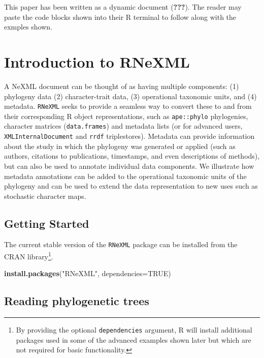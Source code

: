\documentclass[author-year, review, 11pt]{components/elsarticle} %
\newenvironment{Shaded}{\begin{snugshade}}{\end{snugshade}}
\newcommand{\KeywordTok}[1]{\textcolor[rgb]{0.13,0.29,0.53}{\textbf{{#1}}}}
\newcommand{\DataTypeTok}[1]{\textcolor[rgb]{0.13,0.29,0.53}{{#1}}}
\newcommand{\StringTok}[1]{\textcolor[rgb]{0.31,0.60,0.02}{{#1}}}
\newcommand{\OtherTok}[1]{\textcolor[rgb]{0.56,0.35,0.01}{{#1}}}
\newcommand{\NormalTok}[1]{{#1}}
\begin{document}
This paper has been written as a dynamic document ({\textbf{???}}). The
reader may paste the code blocks shown into their R terminal to follow
along with the exmples shown.

\section{Introduction to RNeXML}\label{introduction-to-rnexml}

A NeXML document can be thought of as having multiple components: (1)
phylogeny data (2) character-trait data, (3) operational taxonomic
units, and (4) metadata. \texttt{RNeXML} seeks to provide a seamless way
to convert these to and from their corresponding R object
representations, such as \texttt{ape::phylo} phylogenies, character
matrices (\texttt{data.frames}) and metadata lists (or for advanced
users, \texttt{XMLInternalDocument} and \texttt{rrdf} triplestores).
Metadata can provide information about the study in which the phylogeny
was generated or applied (such as authors, citations to publications,
timestamps, and even descriptions of methods), but can also be used to
annotate individual data components. We illustrate how metadata
annotations can be added to the operational taxonomic units of the
phylogeny and can be used to extend the data representation to new uses
such as stochastic character maps.

\subsection{Getting Started}\label{getting-started}

The current stable version of the \texttt{RNeXML} package can be
installed from the CRAN library\footnote{By providing the optional
  \texttt{dependencies} argument, R will install additional packages
  used in some of the advanced examples shown later but which are not
  required for basic functionality.}.

\begin{Shaded}
\begin{Highlighting}[]
\KeywordTok{install.packages}\NormalTok{(}\StringTok{"RNeXML"}\NormalTok{, }\DataTypeTok{dependencies=}\OtherTok{TRUE}\NormalTok{)}
\end{Highlighting}
\end{Shaded}

\subsection{Reading phylogenetic
trees}\label{reading-phylogenetic-trees}
\end{document}
